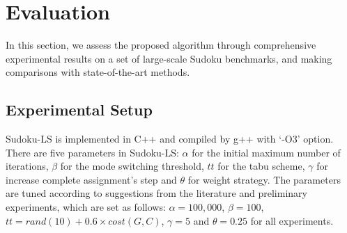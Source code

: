 \documentclass{article}
\begin{document}

\section{Evaluation}

In this section, we assess the proposed algorithm through comprehensive experimental results on a set of large-scale Sudoku benchmarks, and making comparisons with state-of-the-art methods.

\subsection{Experimental Setup}

Sudoku-LS is implemented in C++ and compiled by g++ with `-O3' option. There are five parameters in Sudoku-LS: $\alpha$ for the initial maximum number of iterations, $\beta$ for the mode switching threshold, $tt$ for the tabu scheme, $\gamma$ for increase complete assignment's step and $\theta$ for weight strategy. The parameters are tuned according to suggestions from the literature and preliminary experiments, which are set as follows: $\alpha=100,000$, $\beta=100$, $tt=rand(10)+0.6\times cost(G,C)$, $\gamma=5$ and $\theta=0.25$ for all experiments. 


\end{document}
